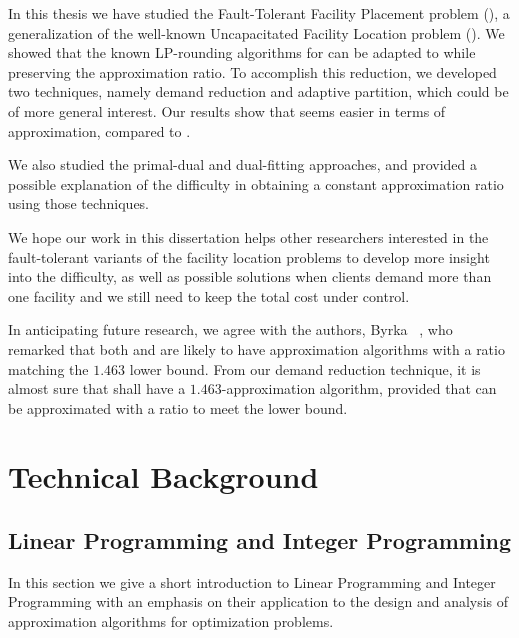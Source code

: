 \documentclass[oneside,final]{ucr}
\begin{document}
In this thesis we have studied the Fault-Tolerant Facility
Placement problem ({\FTFP}), a generalization of the
well-known Uncapacitated Facility Location problem
({\UFL}). We showed that the known LP-rounding algorithms
for {\UFL} can be adapted to {\FTFP} while preserving the
approximation ratio. To accomplish this reduction, we
developed two techniques, namely demand reduction and
adaptive partition, which could be of more general
interest. Our results show that {\FTFP} seems easier in
terms of approximation, compared to {\FTFL}.

We also studied the primal-dual and dual-fitting approaches,
and provided a possible explanation of the difficulty in
obtaining a constant approximation ratio using those
techniques.

We hope our work in this dissertation helps other
researchers interested in the fault-tolerant variants of the
facility location problems to develop more insight into the
difficulty, as well as possible solutions when clients
demand more than one facility and we still need to keep the
total cost under control.

In anticipating future research, we agree with the authors,
Byrka {\etal}~\cite{ByrkaSS10}, who remarked that both
{\UFL} and {\FTFL} are likely to have approximation
algorithms with a ratio matching the $1.463$ lower
bound. From our demand reduction technique, it is almost
sure that {\FTFP} shall have a $1.463$-approximation
algorithm, provided that {\FTFL} can be approximated with a
ratio to meet the lower bound.




\appendix
\chapter{Technical Background}

\section{Linear Programming and Integer Programming}
\label{sec: ILP}

In this section we give a short introduction to Linear
Programming and Integer Programming with an emphasis on
their application to the design and analysis of
approximation algorithms for optimization problems.
\end{document}
